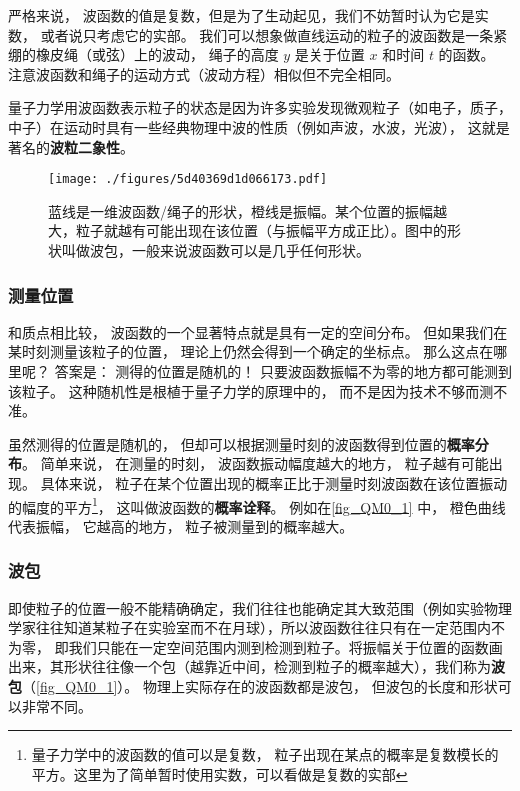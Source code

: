 严格来说， 波函数的值是复数，但是为了生动起见，我们不妨暂时认为它是实数， 或者说只考虑它的实部。 我们可以想象做直线运动的粒子的波函数是一条紧绷的橡皮绳（或弦）上的波动， 绳子的高度 $y$ 是关于位置 $x$ 和时间 $t$ 的函数。 注意波函数和绳子的运动方式（波动方程）相似但不完全相同。

量子力学用波函数表示粒子的状态是因为许多实验发现微观粒子（如电子，质子，中子）在运动时具有一些经典物理中波的性质（例如声波，水波，光波）， 这就是著名的\textbf{波粒二象性}。

\begin{figure}[ht]
\centering
\texttt{[image: ./figures/5d40369d1d066173.pdf]}
\caption{蓝线是一维波函数/绳子的形状，橙线是振幅。某个位置的振幅越大，粒子就越有可能出现在该位置（与振幅平方成正比）。图中的形状叫做波包，一般来说波函数可以是几乎任何形状。} \label{fig_QM0_1}
\end{figure}




\subsubsection{测量位置}
和质点相比较， 波函数的一个显著特点就是具有一定的空间分布。 但如果我们在某时刻测量该粒子的位置， 理论上仍然会得到一个确定的坐标点。 那么这点在哪里呢？ 答案是： 测得的位置是随机的！ 只要波函数振幅不为零的地方都可能测到该粒子。 这种随机性是根植于量子力学的原理中的， 而不是因为技术不够而测不准。

虽然测得的位置是随机的， 但却可以根据测量时刻的波函数得到位置的\textbf{概率分布}。 简单来说， 在测量的时刻， 波函数振动幅度越大的地方， 粒子越有可能出现。 具体来说， 粒子在某个位置出现的概率正比于测量时刻波函数在该位置振动的幅度的平方\footnote{量子力学中的波函数的值可以是复数， 粒子出现在某点的概率是复数模长的平方。这里为了简单暂时使用实数，可以看做是复数的实部}， 这叫做波函数的\textbf{概率诠释}。 例如在\autoref{fig_QM0_1} 中， 橙色曲线代表振幅， 它越高的地方， 粒子被测量到的概率越大。

\subsubsection{波包}
即使粒子的位置一般不能精确确定，我们往往也能确定其大致范围（例如实验物理学家往往知道某粒子在实验室而不在月球），所以波函数往往只有在一定范围内不为零， 即我们只能在一定空间范围内测到检测到粒子。将振幅关于位置的函数画出来，其形状往往像一个包（越靠近中间，检测到粒子的概率越大），我们称为\textbf{波包}（\autoref{fig_QM0_1}）。 物理上实际存在的波函数都是波包， 但波包的长度和形状可以非常不同。

